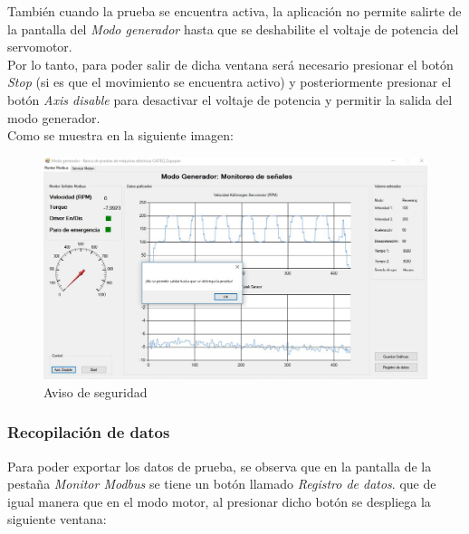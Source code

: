 \documentclass[12pt,titlepage]{article}
\begin{document}
\vspace{18mm}


También cuando la prueba se encuentra activa, la aplicación no permite salirte de la pantalla del \textit{Modo generador} hasta que se deshabilite el voltaje de potencia del servomotor. \\

Por lo tanto, para poder salir de dicha ventana será necesario presionar el botón \textit{Stop} (si es que el movimiento se encuentra activo) y posteriormente presionar el botón \textit{Axis disable} para desactivar el voltaje de potencia y permitir la salida del modo generador. \\

Como se muestra en la siguiente imagen: \\

\newpage
\begin{figure}[H]
\hspace*{0.1cm} 
\includegraphics[scale=0.53]{securityyy}
\caption{Aviso de seguridad}
\end{figure}

\subsubsection{Recopilación de datos}
Para poder exportar los datos de prueba, se observa que en la pantalla de la pestaña \textit{Monitor Modbus} se tiene un botón llamado \textit{Registro de datos}. que de igual manera que en el modo motor, al presionar dicho botón se despliega la siguiente ventana: \\
\end{document}
